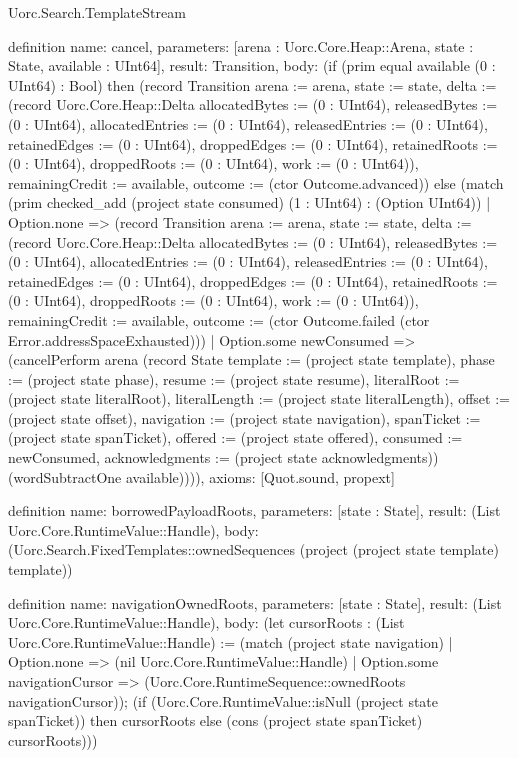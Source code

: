 \begin{lexlean}{Uorc.Search.TemplateStream}
\begin{semanticmodule}
definition{
  name: cancel,
  parameters: [arena : Uorc.Core.Heap::Arena, state : State, available : UInt64],
  result: Transition,
  body: (if (prim equal available (0 : UInt64) : Bool) then (record Transition {arena := arena, state := state, delta := (record Uorc.Core.Heap::Delta {allocatedBytes := (0 : UInt64), releasedBytes := (0 : UInt64), allocatedEntries := (0 : UInt64), releasedEntries := (0 : UInt64), retainedEdges := (0 : UInt64), droppedEdges := (0 : UInt64), retainedRoots := (0 : UInt64), droppedRoots := (0 : UInt64), work := (0 : UInt64)}), remainingCredit := available, outcome := (ctor Outcome.advanced)}) else (match (prim checked_add (project state consumed) (1 : UInt64) : (Option UInt64))
    | Option.none => (record Transition {arena := arena, state := state, delta := (record Uorc.Core.Heap::Delta {allocatedBytes := (0 : UInt64), releasedBytes := (0 : UInt64), allocatedEntries := (0 : UInt64), releasedEntries := (0 : UInt64), retainedEdges := (0 : UInt64), droppedEdges := (0 : UInt64), retainedRoots := (0 : UInt64), droppedRoots := (0 : UInt64), work := (0 : UInt64)}), remainingCredit := available, outcome := (ctor Outcome.failed (ctor Error.addressSpaceExhausted))})
    | Option.some newConsumed => (cancelPerform arena (record State {template := (project state template), phase := (project state phase), resume := (project state resume), literalRoot := (project state literalRoot), literalLength := (project state literalLength), offset := (project state offset), navigation := (project state navigation), spanTicket := (project state spanTicket), offered := (project state offered), consumed := newConsumed, acknowledgments := (project state acknowledgments)}) (wordSubtractOne available)))),
  axioms: [Quot.sound, propext]
}

definition{
  name: borrowedPayloadRoots,
  parameters: [state : State],
  result: (List Uorc.Core.RuntimeValue::Handle),
  body: (Uorc.Search.FixedTemplates::ownedSequences (project (project state template) template))
}

definition{
  name: navigationOwnedRoots,
  parameters: [state : State],
  result: (List Uorc.Core.RuntimeValue::Handle),
  body: (let cursorRoots : (List Uorc.Core.RuntimeValue::Handle) := (match (project state navigation)
    | Option.none => (nil Uorc.Core.RuntimeValue::Handle)
    | Option.some navigationCursor => (Uorc.Core.RuntimeSequence::ownedRoots navigationCursor)); (if (Uorc.Core.RuntimeValue::isNull (project state spanTicket)) then cursorRoots else (cons (project state spanTicket) cursorRoots)))
}


\end{semanticmodule}
\end{lexlean}
